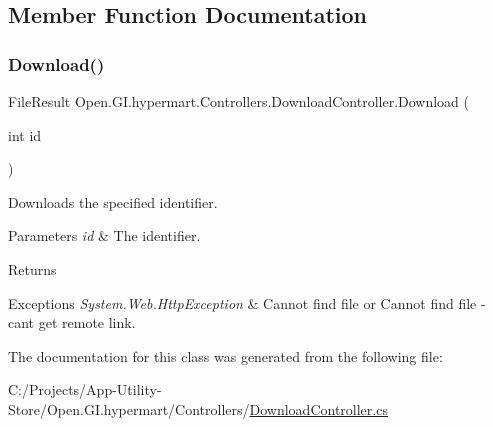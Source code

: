 \subsection{Member Function Documentation}
\hypertarget{class_open_1_1_g_i_1_1hypermart_1_1_controllers_1_1_download_controller_a272d3e80defa78e91555596d44891c47}{}\label{class_open_1_1_g_i_1_1hypermart_1_1_controllers_1_1_download_controller_a272d3e80defa78e91555596d44891c47} 
\subsubsection{\texorpdfstring{Download()}{Download()}}
{\footnotesize\ttfamily File\+Result Open.\+G\+I.\+hypermart.\+Controllers.\+Download\+Controller.\+Download (\begin{DoxyParamCaption}\item[{int}]{id }\end{DoxyParamCaption})}



Downloads the specified identifier. 


\begin{DoxyParams}{Parameters}
{\em id} & The identifier.\\
\hline
\end{DoxyParams}
\begin{DoxyReturn}{Returns}

\end{DoxyReturn}

\begin{DoxyExceptions}{Exceptions}
{\em System.\+Web.\+Http\+Exception} & Cannot find file or Cannot find file -\/ can\textquotesingle{}t get remote link. \\
\hline
\end{DoxyExceptions}


The documentation for this class was generated from the following file\+:\begin{DoxyCompactItemize}
\item 
C\+:/\+Projects/\+App-\/\+Utility-\/\+Store/\+Open.\+G\+I.\+hypermart/\+Controllers/\hyperlink{_download_controller_8cs}{Download\+Controller.\+cs}\end{DoxyCompactItemize}
